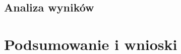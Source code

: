 \documentclass[a4paper,twoside,12pt]{book}
\begin{document}
\section{Analiza wyników}

\chapter{Podsumowanie i wnioski}





%
%
%
%
%        
\end{document}
